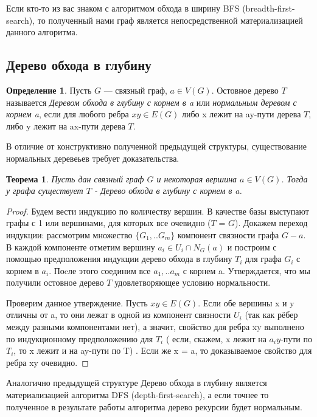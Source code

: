 \documentclass{article}
\newtheorem{theorem}{Теорема}
\theoremstyle{definition}
\newtheorem{definition}{Определение}[section]
\theoremstyle{remark}
\begin{document}
Если кто-то из вас знаком с алгоритмом обхода в ширину BFS (breadth-first-search), то полученный нами граф является непосредственной материализацией данного алгоритма.

\subsection{Дерево обхода в глубину}

\begin{definition}
    Пусть $G$ — связный граф, $a \in V(G)$. Остовное дерево $T$ называется \textit{Деревом обхода в глубину с корнем в a} или \textit{нормальным деревом с корнем a}, если для любого ребра $xy \in E(G)$ либо x лежит на ay-пути дерева $T$, либо y лежит на ax-пути дерева $T$.
\end{definition}

В отличие от конструктивно полученной предыдущей структуры, существование нормальных деревеьев требует доказательства.

\begin{theorem}
    Пусть дан связный граф $G$ и некоторая вершина $a \in V(G)$. Тогда у графа существует $T$ -  Дерево обхода в глубину с корнем в a.
\end{theorem}

\begin{proof}
    Будем вести индукцию по количеству вершин. В качестве базы выступают графы с 1 или вершинами, для которых все очевидно ($T$ = $G$). 
Докажем переход индукции:  рассмотрим множество $\{G_1,..G_m\}$ компонент связности графа $G - a$. В каждой компоненте отметим вершину $a_i \in U_i \cap N_G(a)$ и построим с помощью предположения индукции дерево обхода в глубину $T_i$ для графа $G_i$ с корнем в $a_i$. Поcле этого соединим все $a_1,..a_m$ с корнем a. Утверждается, что мы получили остовное дерево $T$ удовлетворяющее условию нормальности. 

Проверим данное утверждение. Пусть $xy \in E(G)$. Если обе вершины x и y отличны от a, то они лежат в одной из компонент связности $U_i$ (так как рёбер между разными компонентами нет), а значит, свойство для ребра xy выполнено по индукционному предположению для $T_i$ ( если, скажем, x лежит на $a_iy$-пути по $T_i$,  то x лежит и на ay-пути по T) . Если же x = a, то доказываемое свойство для ребра xy очевидно.
\end{proof}

Аналогично предыдущей структуре Дерево обхода в глубину является материализацией алгоритма DFS (depth-first-search), а если точнее то полученное в результате работы алгоритма дерево рекурсии будет нормальным.
\end{document}
